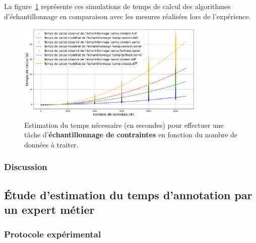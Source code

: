 			La figure~\ref{figure:4.3.1-ETUDE-COUTS-TEMPS-CALCUL-MODELISATION-SAMPLING} représente ces simulations de temps de calcul des algorithmes d'échantillonnage en comparaison avec les mesures réalisées lors de l'expérience.
			\newline
			\begin{figure}[!htb]
				\centering
				\includegraphics[width=0.8\textwidth]{figures/etude-temps-calcul-modelisation-4samp}
				\caption{Estimation du temps nécessaire (en secondes) pour effectuer une tâche d'\textbf{échantillonnage de contraintes} en fonction du nombre de données à traiter.}
				\label{figure:4.3.1-ETUDE-COUTS-TEMPS-CALCUL-MODELISATION-SAMPLING}
			\end{figure}

		\subsubsection{Discussion}
		
	
	\subsection{Étude d'estimation du temps d'annotation par un expert métier}
	\label{section:4.3.2-ETUDE-COUTS-TEMPS-ANNOTATION}
	
		\subsubsection{Protocole expérimental}
		

